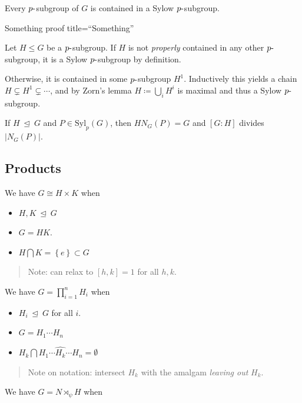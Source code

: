 Every \(p{\hbox{-}}\)subgroup of \(G\) is contained in a Sylow
\(p{\hbox{-}}\)subgroup.

Something proof title=``Something''

Let \(H \leq G\) be a \(p{\hbox{-}}\)subgroup. If \(H\) is not
\emph{properly} contained in any other \(p{\hbox{-}}\)subgroup, it is a
Sylow \(p{\hbox{-}}\)subgroup by definition.

Otherwise, it is contained in some \(p{\hbox{-}}\)subgroup \(H^1\).
Inductively this yields a chain \(H \subsetneq H^1 \subsetneq \cdots\),
and by Zorn's lemma \(H\coloneqq\bigcup_i H^i\) is maximal and thus a
Sylow \(p{\hbox{-}}\)subgroup.

If \(H{~\trianglelefteq~}G\) and \(P \in \mathrm{Syl}_p(G)\), then
\(H N_G(P) = G\) and \([G: H]\) divides
\({\left\lvert {N_G(P)} \right\rvert}\).

\hypertarget{products}{%
\subsection{Products}\label{products}}

We have \(G \cong H \times K\) when

\begin{itemize}
\item
  \(H, K {~\trianglelefteq~}G\)
\item
  \(G = HK\).
\item
  \(H\bigcap K = \left\{{e}\right\} \subset G\)
\end{itemize}

\begin{quote}
Note: can relax to \([h,k] = 1\) for all \(h, k\).
\end{quote}

We have \(G = \prod_{i=1}^n H_i\) when

\begin{itemize}
\item
  \(H_i {~\trianglelefteq~}G\) for all \(i\).
\item
  \(G = H_1 \cdots H_n\)
\item
  \(H_k \bigcap H_1 \cdots \widehat{H_k} \cdots H_n = \emptyset\)
\end{itemize}

\begin{quote}
Note on notation: intersect \(H_k\) with the amalgam \emph{leaving out}
\(H_k\).
\end{quote}

We have \(G = N \rtimes_\psi H\) when

